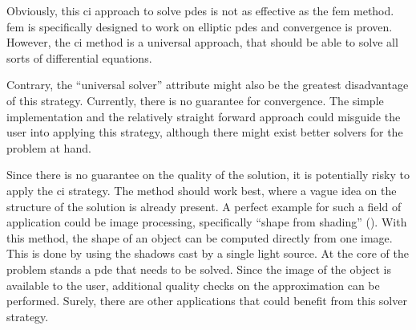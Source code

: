 \documentclass[./\jobname.tex]{subfiles}
\begin{document}
Obviously, this \gls{ci} approach to solve \gls{pde}s is not as effective as the \gls{fem} method. \gls{fem} is specifically designed to work on elliptic \gls{pde}s and convergence is proven. However, the \gls{ci} method is a universal approach, that should be able to solve all sorts of differential equations. 

Contrary, the ``universal solver'' attribute might also be the greatest disadvantage of this strategy. Currently, there is no guarantee for convergence. The simple implementation and the relatively straight forward approach could misguide the user into applying this strategy, although there might exist better solvers for the problem at hand. 

Since there is no guarantee on the quality of the solution, it is potentially risky to apply the \gls{ci} strategy. The method should work best, where a vague idea on the structure of the solution is already present. A perfect example for such a field of application could be image processing, specifically ``shape from shading'' (\cite{horn_shape_1970}). With this method, the shape of an object can be computed directly from one image. This is done by using the shadows cast by a single light source. At the core of the problem stands a \gls{pde} that needs to be solved. Since the image of the object is available to the user, additional quality checks on the approximation can be performed. Surely, there are other applications that could benefit from this solver strategy. 
\end{document}

